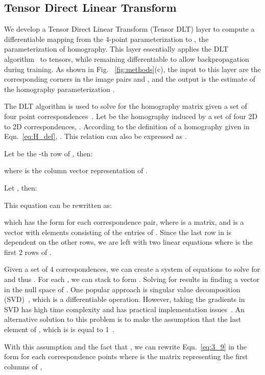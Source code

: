 \documentclass[letterpaper, 10 pt, conference]{ieeeconf}
\begin{document}
\subsection{Tensor Direct Linear Transform}
\label{sec:mapping}
We develop a Tensor Direct Linear Transform (Tensor DLT) layer to compute a differentiable mapping from the 4-point parameterization  to , the  parameterization of homography. This layer essentially applies the DLT algorithm~\cite{Hartley2004} to tensors, while remaining differentiable to allow backpropagation during training. As shown in Fig. ~\ref{fig:methods}(c), the input to this layer are the corresponding corners in the image pairs  and , and the output is the estimate of the  homography parameterization . 

The DLT algorithm is used
to solve for the homography matrix  given a set of four point correspondences~\cite{Hartley2004}. Let  be the homography induced by a set of four 2D to 2D correspondences, . According to the definition of a homography given in Eqn.~\eqref{eq:H_def}, . This relation can also be expressed as . 

Let  be the -th row of , then: 

where  is the column vector representation of . 

Let , then:


This equation can be rewritten as: 

which has the form  for each  correspondence pair, where  is a  matrix, and  is a vector with  elements consisting of the entries of . Since the last row in  is dependent on the other rows, we are left with two linear equations  where  is the first 2 rows of .

Given a set of 4 correspondences, we can create a system of equations to solve for  and thus . For each , we can stack  to form . Solving for  results in finding a vector in the null space of . One popular approach is singular value decomposition (SVD)~\cite{golub1970singular}, which is a differentiable operation. However, taking the gradients in SVD has high time complexity and has practical implementation issues~\cite{papadopoulo2000estimating}. An alternative solution to this problem is to make the assumption that the last element of , which is  is equal to 1~\cite{hartley2003multiple}.  

With this assumption and the fact that , we can rewrite Eqn.~\eqref{eq:3_9} in the form  for each  correspondence points where  is the  matrix representing the first  columns of ,
  
\end{document}
